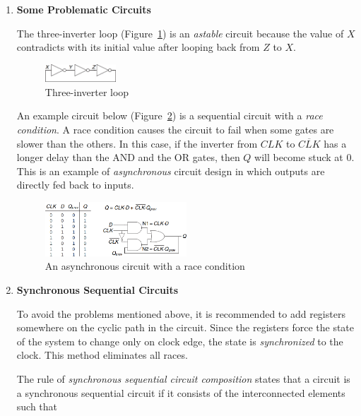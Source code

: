 \documentclass[12pt]{article}
\begin{document}
\begin{enumerate}
  \item \textbf{Some Problematic Circuits}

  The three-inverter loop (Figure~\ref{figure:10}) is an \textit{astable} circuit because the value of $X$ contradicts with its initial value after looping back from $Z$ to $X$.

  \begin{figure}[ht]
    \centering
    \includegraphics[width=0.25\textwidth]{three_inverter_loop.png}
    \caption{Three-inverter loop}
    \label{figure:10}
  \end{figure}

  An example circuit below (Figure~\ref{figure:11}) is a sequential circuit with a \textit{race condition}. A race condition causes the circuit to fail when some gates are slower than the others. In this case, if the inverter from $CLK$ to $\overline{CLK}$ has a longer delay than the AND and the OR gates, then $Q$ will become stuck at 0. This is an example of \textit{asynchronous} circuit design in which outputs are directly fed back to inputs.

  \begin{figure}[ht]
    \centering
    \includegraphics[width=0.5\textwidth]{race_condition_example.png}
    \caption{An asynchronous circuit with a race condition}
    \label{figure:11}
  \end{figure}

  \item \textbf{Synchronous Sequential Circuits}

  To avoid the problems mentioned above, it is recommended to add registers somewhere on the cyclic path in the circuit. Since the registers force the state of the system to change only on clock edge, the state is \textit{synchronized} to the clock. This method eliminates all races.

  The rule of \textit{synchronous sequential circuit composition} states that a circuit is a synchronous sequential circuit if it consists of the interconnected elements such that


\end{enumerate}
\end{document}
